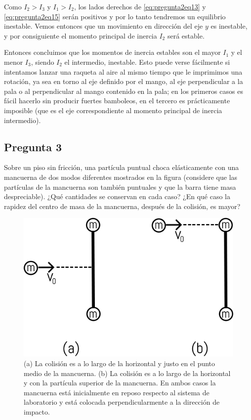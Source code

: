 \documentclass[a4paper,10pt]{article}
\numberwithin{equation}{section}
\begin{document}
Como $I_2 > I_3$ y $I_1 > I_2$, los lados derechos de \eqref{eq:pregunta2eq13} y 
\eqref{eq:pregunta2eq15} serán positivos y por lo tanto tendremos un equilibrio 
inestable. Vemos entonces que un movimiento en dirección del eje $y$ es inestable, 
y por consiguiente el momento principal de inercia $I_2$ será estable. 

\vspace{.3cm}

Entonces concluimos que los momentos de inercia estables son el mayor $I_1$ y 
el menor $I_3$, siendo $I_2$ el intermedio, inestable. Esto puede verse fácilmente 
si intentamos lanzar una raqueta al aire al mismo tiempo que le imprimimos una 
rotación, ya sea en torno al eje definido por el mango, al eje perpendicular a la 
pala o al perpendicular al mango contenido en la pala; en los primeros casos es 
fácil hacerlo sin producir fuertes bamboleos, en el tercero es prácticamente 
imposible (que es el eje correspondiente al momento principal de inercia intermedio).

\subsection{Pregunta 3}

Sobre un piso sin fricción, una partícula puntual choca elásticamente con una mancuerna de dos 
modos diferentes mostrados en la figura (considere que las partículas de la mancuerna son también
puntuales y que la barra tiene masa despreciable). ¿Qué cantidades se conservan en cada caso? 
¿En qué caso la rapidez del centro de masa de la mancuerna, después de la colisión, es mayor?

\vspace{.3cm}

\begin{figure}[H]
 \center 
 \includegraphics[scale=0.4]{fig1}
 \caption{(a) La colisión es a lo largo de la horizontal y justo en el punto medio 
 de la mancuerna. (b) La colisión es a lo largo de la horizontal y con la partícula 
 superior de la mancuerna. En ambos casos la mancuerna está inicialmente en reposo 
 respecto al sistema de laboratorio y está colocada perpendicularmente a la dirección 
 de impacto.}
\end{figure}
\end{document}
